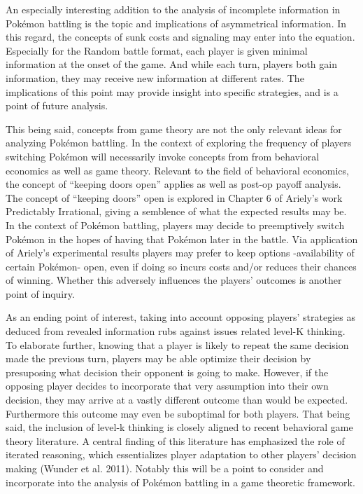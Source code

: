 \documentclass[12pt,twoside]{reedthesis}
\begin{document}
  An especially interesting addition to the analysis of incomplete
  information in Pokémon battling is the topic and implications of
  asymmetrical information. In this regard, the concepts of sunk costs and
  signaling may enter into the equation. Especially for the Random battle
  format, each player is given minimal information at the onset of the
  game. And while each turn, players both gain information, they may
  receive new information at different rates. The implications of this
  point may provide insight into specific strategies, and is a point of
  future analysis.
  
  This being said, concepts from game theory are not the only relevant
  ideas for analyzing Pokémon battling. In the context of exploring the
  frequency of players switching Pokémon will necessarily invoke concepts
  from from behavioral economics as well as game theory. Relevant to the
  field of behavioral economics, the concept of ``keeping doors open''
  applies as well as post-op payoff analysis. The concept of ``keeping
  doors'' open is explored in Chapter 6 of Ariely's work Predictably
  Irrational, giving a semblence of what the expected results may be. In
  the context of Pokémon battling, players may decide to preemptively
  switch Pokémon in the hopes of having that Pokémon later in the battle.
  Via application of Ariely's experimental results players may prefer to
  keep options -availability of certain Pokémon- open, even if doing so
  incurs costs and/or reduces their chances of winning. Whether this
  adversely influences the players' outcomes is another point of inquiry.
  
  As an ending point of interest, taking into account opposing players'
  strategies as deduced from revealed information rubs against issues
  related level-K thinking. To elaborate further, knowing that a player is
  likely to repeat the same decision made the previous turn, players may
  be able optimize their decision by presuposing what decision their
  opponent is going to make. However, if the opposing player decides to
  incorporate that very assumption into their own decision, they may
  arrive at a vastly different outcome than would be expected. Furthermore
  this outcome may even be suboptimal for both players. That being said,
  the inclusion of level-k thinking is closely aligned to recent
  behavioral game theory literature. A central finding of this literature
  has emphasized the role of iterated reasoning, which essentializes
  player adaptation to other players' decision making (Wunder et al.
  2011). Notably this will be a point to consider and incorporate into the
  analysis of Pokémon battling in a game theoretic framework.
  
\end{document}
